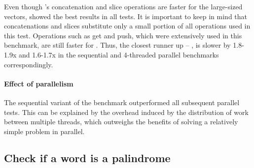 Even though \rrbvec{}'s concatenation and slice operations are faster for the large-sized vectors, \stdvec{} showed the best results in all tests. It is important to keep in mind that concatenations and slices substitute only a small portion of all operations used in this test. Operations such as get and push, which were extensively used in this benchmark, are still faster for \stdvec{}. Thus, the closest runner up -- \pvec{}, is slower by 1.8-1.9x and 1.6-1.7x in the sequential and 4-threaded parallel benchmarks correspondingly.

\paragraph{Effect of parallelism}
The sequential variant of the benchmark outperformed all subsequent parallel tests. This can be explained by the overhead induced by the distribution of work between multiple threads, which outweighs the benefits of solving a relatively simple problem in parallel.

\subsection{Check if a word is a palindrome}

